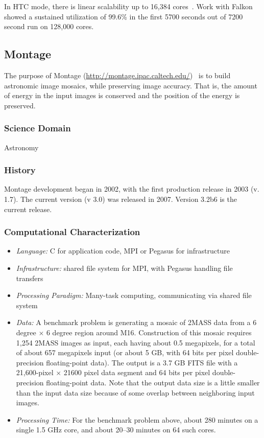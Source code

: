 \documentclass[10pt,letterpaper]{article}
\begin{document}
In HTC mode, there is linear scalability up to 16,384 cores~\cite{IBM-DOCK-08}. Work with Falkon showed a sustained utilization of 99.6\% in the first 5700 seconds out of 7200 second run on 128,000 cores.~\cite{FALKON-SC-08}

\subsection{Montage\label{sec:montage}}


The purpose of Montage (\url{http://montage.ipac.caltech.edu/})~\cite{montage1,montage2} is to build astronomic image mosaics, while preserving image accuracy.
That is, the amount of energy in the input images is conserved and the position of the energy is preserved.

\subsubsection{Science Domain} Astronomy

\subsubsection{History}

Montage development began in 2002, with the first production release in 2003 (v. 1.7).  The current version (v 3.0) was released in 2007.  Version 3.2b6 is the current release. 


\subsubsection{Computational Characterization}

\begin {itemize}
\item {\em Language:} C for application code, MPI or Pegasus for infrastructure
\item {\em Infrastructure:} shared file system for MPI, with Pegasus handling file transfers
\item {\em Processing Paradigm:} Many-task computing, communicating via shared file system
\item {\em Data:} A benchmark problem is
generating a mosaic of 2MASS data from a 6 degree $\times$ 6 degree
region around M16.  Construction of this mosaic requires 1,254 2MASS
images as input, each having about 0.5 megapixels, for a total of
about 657 megapixels input (or about 5 GB, with 64 bits per pixel
double-precision floating-point data).  The output is a 3.7 GB FITS
file with a 21,600-pixel $\times$ 21600 pixel data segment and 64
bits per pixel double-precision floating-point data.  Note that the
output data size is a little smaller than the input data size because
of some overlap  between neighboring input images.
\item {\em Processing Time:} For the benchmark problem above, about 280 minutes on a single 1.5 GHz core, and about 20--30 minutes on 64 such cores.
\end {itemize}
\end{document}
